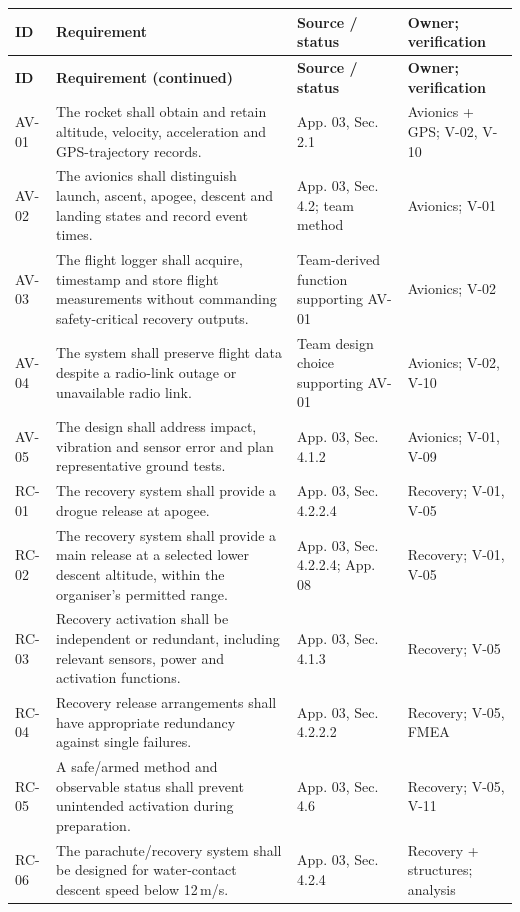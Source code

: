 \footnotesize
\begingroup
{}
\begin{longtable}{@{}L{12mm}L{71mm}L{33mm}L{34mm}@{}}
\toprule{}\textbf{ID}&\textbf{Requirement}&\textbf{Source / status}&\textbf{Owner; verification}\\\midrule\endfirsthead
\toprule{}\textbf{ID}&\textbf{Requirement (continued)}&\textbf{Source / status}&\textbf{Owner; verification}\\\midrule\endhead
\bottomrule\endlastfoot
AV-01 & The rocket shall obtain and retain altitude, velocity, acceleration and GPS-trajectory records. & App. 03, Sec. 2.1 \cite{rtc2027app03} & Avionics + GPS; V-02, V-10\\
AV-02 & The avionics shall distinguish launch, ascent, apogee, descent and landing states and record event times. & App. 03, Sec. 4.2; team method & Avionics; V-01\\
AV-03 & The flight logger shall acquire, timestamp and store flight measurements without commanding safety-critical recovery outputs. & Team-derived function supporting AV-01 & Avionics; V-02\\
AV-04 & The system shall preserve flight data despite a radio-link outage or unavailable radio link. & Team design choice supporting AV-01 & Avionics; V-02, V-10\\
AV-05 & The design shall address impact, vibration and sensor error and plan representative ground tests. & App. 03, Sec. 4.1.2 \cite{rtc2027app03} & Avionics; V-01, V-09\\
RC-01 & The recovery system shall provide a drogue release at apogee. & App. 03, Sec. 4.2.2.4 & Recovery; V-01, V-05\\
RC-02 & The recovery system shall provide a main release at a selected lower descent altitude, within the organiser's permitted range. & App. 03, Sec. 4.2.2.4; App. 08 & Recovery; V-01, V-05\\
RC-03 & Recovery activation shall be independent or redundant, including relevant sensors, power and activation functions. & App. 03, Sec. 4.1.3 & Recovery; V-05\\
RC-04 & Recovery release arrangements shall have appropriate redundancy against single failures. & App. 03, Sec. 4.2.2.2 & Recovery; V-05, FMEA\\
RC-05 & A safe/armed method and observable status shall prevent unintended activation during preparation. & App. 03, Sec. 4.6 & Recovery; V-05, V-11\\
RC-06 & The parachute/recovery system shall be designed for water-contact descent speed below 12\,m/s. & App. 03, Sec. 4.2.4 & Recovery + structures; analysis\\

\end{longtable}
